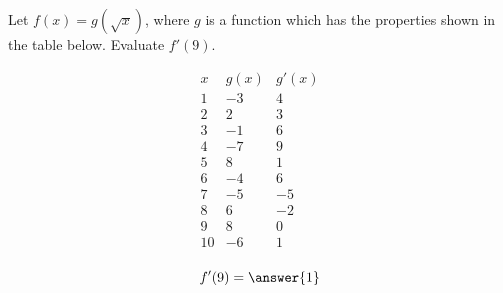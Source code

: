 \documentclass{ximera}
\author{Steven Gubkin}
\begin{document}
\begin{exercise}


Let $f(x) = g(\sqrt{x})$, where $g$ is a function which has the properties shown in the table below.  Evaluate $f'(9)$.

\[
\begin{array}{c|c|c}
 x & g(x) & g'(x)\\ \hline
1 & -3 & 4\\
2 & 2 & 3\\
3 & -1 & 6\\
4 & -7 & 9\\
5 & 8 & 1\\
6 & -4 & 6\\
7 & -5 & -5\\
8 & 6 & -2\\
9 & 8 & 0\\
10 & -6 & 1\\
\end{array}
\]

\begin{prompt}
	$$f'(9) = \answer{1}$$
\end{prompt}


\end{exercise}
\end{document}
